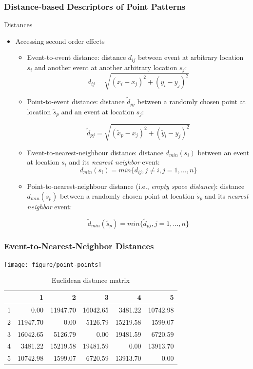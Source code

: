 \documentclass[10pt]{beamer}\usepackage[]{graphicx}\usepackage[]{color}
\newcommand{\bitemize}{\begin{itemize}}
\newcommand{\eitemize}{\end{itemize}}
\newcommand{\bblock}{\begin{block}}
\newcommand{\eblock}{\end{block}}
\begin{document}
\begin{frame}
\frametitle{Distance-based Descriptors of Point Patterns}

\bblock{Distances}
\bitemize
\item Accessing second order effects
\bitemize
\item Event-to-event distance: distance $d_{ij}$ between event at arbitrary location $s_i$ and another
event at another arbitrary location $s_j$:
{\scriptsize \[
d_{ij} = \sqrt{(x_i - x_j)^2 + (y_i-y_j)^2}
\]}

\item Point-to-event distance: distance $\tilde{d}_{pj}$ between a randomly chosen point at location $\tilde{s}_p$
and an event at location $s_j$:

{\scriptsize \[
\tilde{d}_{pj} = \sqrt{(\tilde{x}_p - x_j)^2 + (\tilde{y}_i-y_j)^2}
\]
}

\item Event-to-nearest-neighbour distance: distance $d_{min}(s_i)$ between an event at location $s_i$ and its
{\it nearest neighbor} event: 
{\scriptsize \[
d_{min}(s_i) = min\{d_{ij}, j \neq i, j = 1, \ldots,n\}
\]
}
\item Point-to-nearest-neighbour distance (i.e., {\it empty space distance}): distance $d_{min}(\tilde{s}_p)$ between a randomly chosen point at location
$\tilde{s}_p$ and its {\it nearest neighbor} event:

{\scriptsize \[
\tilde{d}_{min}(\tilde{s}_p) = min\{\tilde{d}_{pj}, j = 1, \ldots,n\}
\]}

\eitemize
\eitemize
\eblock
\end{frame}

\begin{frame}
\frametitle{Event-to-Nearest-Neighbor Distances}



{\centering \texttt{[image: figure/point-points]} 

}





\begin{table}[ht]
\centering
\begin{tabular}{rrrrrr}
  \hline
 & 1 & 2 & 3 & 4 & 5 \\ 
  \hline
1 & 0.00 & 11947.70 & 16042.65 & 3481.22 & 10742.98 \\ 
  2 & 11947.70 & 0.00 & 5126.79 & 15219.58 & 1599.07 \\ 
  3 & 16042.65 & 5126.79 & 0.00 & 19481.59 & 6720.59 \\ 
  4 & 3481.22 & 15219.58 & 19481.59 & 0.00 & 13913.70 \\ 
  5 & 10742.98 & 1599.07 & 6720.59 & 13913.70 & 0.00 \\ 
   \hline
\end{tabular}
\caption{Euclidean distance matrix} 
\end{table}


\end{frame}
\end{document}
